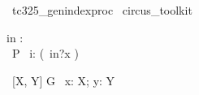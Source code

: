 
\begin{zsection}
  \SECTION\ tc325\_genindexproc \parents\ circus\_toolkit
\end{zsection}

\begin{circus}
    \circchannel in : \nat \\
    \circprocess\ P \circdef\  i: \nat \circindex (\circbegin \circspot\ in?x \then \Skip  \circend)
\end{circus}

\begin{circus}
     \circprocess\ [X, Y] G \circdef\ x: X; y: Y \circspot\ \circbegin \circspot \Skip \circend
\end{circus}



